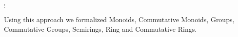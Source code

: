 \begin{code}
  \AgdaSpace{}%
  \AgdaSymbol{=}\AgdaSpace{}%
  \AgdaSpace{}%
  \AgdaSymbol{\{}\AgdaSymbol{\}}\AgdaSpace{}%
  \AgdaSpace{}%
  \<%
  \\
  \\[\AgdaEmptyExtraSkip]%
  \>[2]\AgdaSpace{}%
  \AgdaSymbol{:}\AgdaSpace{}%
  \<%
  \\
  \>[2]\AgdaSpace{}%
  \AgdaSymbol{=}\AgdaSpace{}%
  \AgdaSpace{}%
  \AgdaSymbol{\{}\AgdaSpace{}%
  \AgdaSpace{}%
  \AgdaSymbol{=}\AgdaSpace{}%
  \AgdaSpace{}%
  \AgdaSymbol{;}\AgdaSpace{}%
  \AgdaSpace{}%
  \AgdaSymbol{=}\AgdaSpace{}%
  \AgdaSpace{}%
  \AgdaSymbol{\}}\<%
  \\%
  \\[\AgdaEmptyExtraSkip]%
  \>[2]\AgdaSpace{}%
  \AgdaSpace{}%
  \<%
  \\
  \>[2][@{}l@{\AgdaIndent{0}}]%
  \>[4]\AgdaSpace{}%
  \AgdaSpace{}%
  \\
  \>[4]$\vdots$
  \\
  \>[4]\AgdaSpace{}%
  \AgdaSymbol{=}\AgdaSpace{}%
  \AgdaSpace{}%
  \AgdaSpace{}%
  \AgdaSpace{}%
  \AgdaSpace{}%
  \<%
  \<%
\end{code}


\noindent
Using this approach we formalized Monoids, Commutative Monoids, Groups,
Commutative Groups, Semirings, Ring and Commutative Rings.
